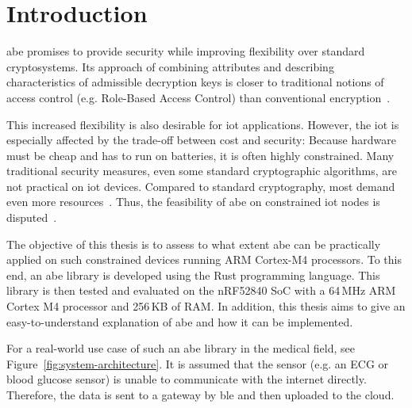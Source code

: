 
\chapter{Introduction}\label{chapter:introduction}

\acrfull{abe} promises to provide security while improving flexibility over standard cryptosystems.
Its approach of combining \glspl{attribute} and  describing characteristics of admissible decryption keys is closer to traditional notions of access control (e.g. Role-Based Access Control) than conventional encryption~\cite{bethencourt_ciphertext-policy_2007}.

This increased flexibility is also desirable for \acrfull{iot} applications.
However, the \acrshort{iot} is especially affected by the trade-off between cost and security:
Because hardware must be cheap and has to run on batteries, it is often highly constrained.
Many traditional security measures, even some standard cryptographic algorithms, are not practical on \acrshort{iot} devices.
Compared to standard cryptography, most  demand even more resources~\cite{wang_performance_2014}.
Thus, the feasibility of \acrshort{abe} on constrained \acrshort{iot} nodes is disputed~\cite{ambrosin_feasibility_2016,ambrosin_feasibility_2015,borgh_attribute-based_2016,girgenti_feasibility_2019,wang_performance_2014}.

The objective of this thesis is to assess to what extent \acrshort{abe} can be practically applied on such constrained devices running ARM Cortex-M4 processors.
To this end, an \acrshort{abe} library is developed using the Rust programming language.
This library is then tested and evaluated on the nRF52840 SoC with a 64\,MHz ARM Cortex M4 processor and 256\,KB of RAM.
In addition, this thesis aims to give an easy-to-understand explanation of \acrshort{abe} and how it can be implemented.



For a real-world use case of such an \acrshort{abe} library in the medical field, see Figure~\ref{fig:system-architecture}. %
It is assumed that the sensor (e.g. an ECG or blood glucose sensor) is unable to communicate with the internet directly.
Therefore, the data is sent to a gateway by \acrfull{ble} and then uploaded to the cloud.

